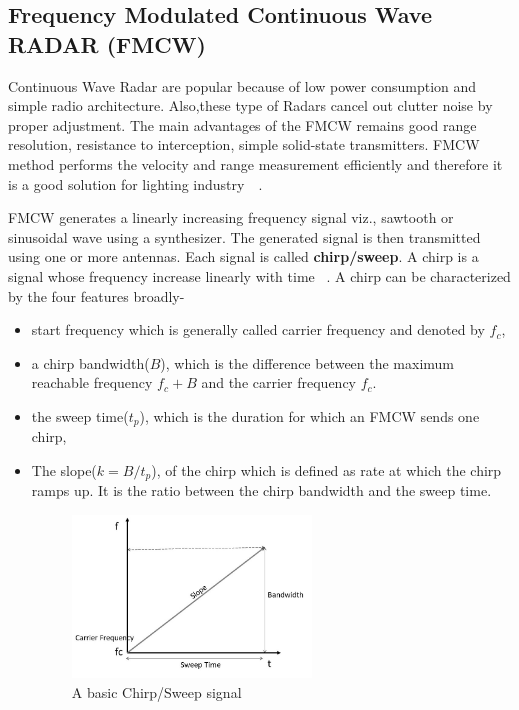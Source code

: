 \subsection{Frequency Modulated Continuous Wave RADAR (FMCW)}

Continuous Wave Radar are popular because of low power consumption and simple radio architecture. Also,these type of Radars cancel out clutter noise by proper adjustment. The main advantages of the FMCW remains good range resolution, resistance to interception, simple solid-state transmitters. FMCW method performs the velocity and range measurement efficiently and therefore it is a good solution for lighting industry~\cite{arai2000life}~\cite{li2006experiment}.


FMCW generates a linearly increasing frequency signal viz., sawtooth or sinusoidal wave using a synthesizer. The generated signal is then transmitted using one or more antennas.
Each signal is called \textbf{chirp/sweep}. A chirp is a signal whose frequency increase linearly with time ~\cite{rao_2017}. A chirp can be characterized by the four features broadly-

\begin{itemize}
    \item start frequency which is generally called carrier frequency and denoted by \(f_{c}\),
    \item a chirp bandwidth(\(B\)), which is the difference between the maximum reachable frequency  \(f_{c} + B \)  and the carrier frequency \(f_{c}\).
    \item the sweep time(\(t_{p}\)), which is the duration for which an FMCW sends one chirp,
    \item The slope(\(k= B/t_{p}\)), of the chirp which is defined as rate at which the chirp ramps up. It is the ratio between the chirp bandwidth and the sweep time.
    
 \begin{figure}[ht]
  \begin{center}
    \includegraphics[width=0.60\textwidth]{Master's thesis/images/sweep.jpg} 
    \caption{A basic Chirp/Sweep signal}
    \label{fig:sweep}
  \end{center}
\end{figure}   
\end{itemize}

